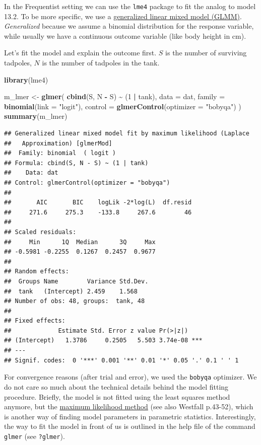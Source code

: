 \documentclass[
]{book}
\newenvironment{Shaded}{\begin{snugshade}}{\end{snugshade}}
\newcommand{\AttributeTok}[1]{\textcolor[rgb]{0.13,0.29,0.53}{#1}}
\newcommand{\DecValTok}[1]{\textcolor[rgb]{0.00,0.00,0.81}{#1}}
\newcommand{\FunctionTok}[1]{\textcolor[rgb]{0.13,0.29,0.53}{\textbf{#1}}}
\newcommand{\NormalTok}[1]{#1}
\newcommand{\OtherTok}[1]{\textcolor[rgb]{0.56,0.35,0.01}{#1}}
\newcommand{\SpecialCharTok}[1]{\textcolor[rgb]{0.81,0.36,0.00}{\textbf{#1}}}
\newcommand{\StringTok}[1]{\textcolor[rgb]{0.31,0.60,0.02}{#1}}
\begin{document}
In the Frequentist setting we can use the \texttt{lme4} package to fit the analog
to model 13.2. To be more specific,
we use a \href{https://en.wikipedia.org/wiki/Generalized_linear_mixed_model}{generalized linear mixed model (GLMM)}.
\emph{Generalized} because we assume a binomial distribution for the response variable,
while usually we have a continuous outcome variable (like body height in cm).

Let's fit the model and explain the outcome first. \(S\) is the number of surviving tadpoles,
\(N\) is the number of tadpoles in the tank.

\begin{Shaded}
\begin{Highlighting}[]
\FunctionTok{library}\NormalTok{(lme4)}

\NormalTok{m\_lmer }\OtherTok{\textless{}{-}} \FunctionTok{glmer}\NormalTok{(}
  \FunctionTok{cbind}\NormalTok{(S, N }\SpecialCharTok{{-}}\NormalTok{ S) }\SpecialCharTok{\textasciitilde{}}\NormalTok{ (}\DecValTok{1} \SpecialCharTok{|}\NormalTok{ tank),}
  \AttributeTok{data =}\NormalTok{ dat,}
  \AttributeTok{family =} \FunctionTok{binomial}\NormalTok{(}\AttributeTok{link =} \StringTok{"logit"}\NormalTok{),}
  \AttributeTok{control =} \FunctionTok{glmerControl}\NormalTok{(}\AttributeTok{optimizer =} \StringTok{"bobyqa"}\NormalTok{)}
\NormalTok{)}
\FunctionTok{summary}\NormalTok{(m\_lmer)}
\end{Highlighting}
\end{Shaded}

\begin{verbatim}
## Generalized linear mixed model fit by maximum likelihood (Laplace
##   Approximation) [glmerMod]
##  Family: binomial  ( logit )
## Formula: cbind(S, N - S) ~ (1 | tank)
##    Data: dat
## Control: glmerControl(optimizer = "bobyqa")
## 
##       AIC       BIC    logLik -2*log(L)  df.resid 
##     271.6     275.3    -133.8     267.6        46 
## 
## Scaled residuals: 
##     Min      1Q  Median      3Q     Max 
## -0.5981 -0.2255  0.1267  0.2457  0.9677 
## 
## Random effects:
##  Groups Name        Variance Std.Dev.
##  tank   (Intercept) 2.459    1.568   
## Number of obs: 48, groups:  tank, 48
## 
## Fixed effects:
##             Estimate Std. Error z value Pr(>|z|)    
## (Intercept)   1.3786     0.2505   5.503 3.74e-08 ***
## ---
## Signif. codes:  0 '***' 0.001 '**' 0.01 '*' 0.05 '.' 0.1 ' ' 1
\end{verbatim}

For convergence reasons (after trial and error), we used the \texttt{bobyqa} optimizer.
We do not care so much about the technical details behind the model fitting procedure.
Briefly, the model is not fitted using the least squares method anymore,
but the \href{https://www.youtube.com/watch?v=XepXtl9YKwc&ab_channel=StatQuestwithJoshStarmer}{maximum likelihood method}
(see also Westfall p.43-52),
which is another way of finding model parameters in parametric statistics.
Interestingly, the way to fit the model in front of us is outlined in the help file of the command
\texttt{glmer} (see \texttt{?glmer}).
\end{document}
